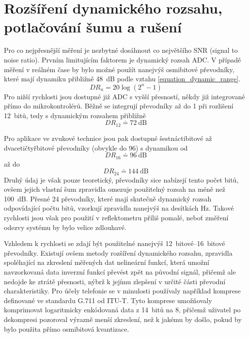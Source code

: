 \chapter{Rozšíření dynamického rozsahu, potlačování šumu a rušení}
Pro co nejpřesnější měření je nezbytné dosáhnout co největšího SNR (signal to noise ratio). Prvním limitujícím faktorem je dynamický rozsah ADC. V případě měření v reálném čase by bylo možné použít nanejvýš osmibitové převodníky, které mají dynamiku přibližně \SI{48}{\deci\bel} podle vztahu \ref{equation_dynamic_range}.
\begin{equation}
	 DR_n=20\log\left(2^n-1\right)
	 \label{equation_dynamic_range}
\end{equation}
Pro nižší rychlosti jsou dostupné již ADC s vyšší přesností, někdy již integrované přímo do mikrokontrolérů. Běžně se integrují převodníky až do \SI{1}{\megasample} při rozlišení 12~bitů, tedy s dynamickým rozsahem přibližně
\begin{equation}
	DR_{12}\doteq \SI{72}{\deci\bel}
\end{equation}

Pro aplikace ve zvukové technice jsou pak dostupné šestnáctibitové až dvacetičtyřbitové převodníky (obvykle do \SI{96}{\kilosample}) s dynamikou od 
\begin{equation}
	DR_{16}\doteq \SI{96}{\deci\bel}
\end{equation} až do
\begin{equation}
	DR_{24}\doteq \SI{144}{\deci\bel}
\end{equation}
 Druhý údaj je však pouze teoretický, převodníky sice nabízejí tento počet bitů, ovšem jejich vlastní šum zpravidla omezuje použitelný rozsah na méně než \SI{100}{\deci\bel}. Přesné \SI{24}{\bit} převodníky, které mají skutečně dynamický rozsah odpovídající počtu bitů, vzorkují zpravidla nanejvýš na desítkách \si{\hertz}. Takové rychlosti jsou však pro použití v reflektometru příliš pomalé, neboť změření odezvy systému by bylo velice zdlouhavé.

Vzhledem k rychlosti se zdají být použitelné nanejvýš \SIrange{12}{16}{bitové} převodníky. Existují ovšem metody rozšíření dynamického rozsahu, zpravidla spoléhající na zkreslení měřených dat nelineární funkcí, která umožní navzorkovaná data inverzní funkcí převést zpět na původní signál, přičemž ale nedojde ke ztrátě přesnosti, nýbrž k jejímu zlepšení v určité části převodní charakteristiky. Pro účely telefonie se v minulosti používaly například komprese definované ve standardu G.711 od ITU-T. Tyto komprese umožňovaly komprimovat logaritmicky enkódovaná data z 14~bitů na 8, přičemž uživatel po dekompresi pozoroval výrazně menší zkreslení, než k jakému by došlo, pokud by bylo použita přímo osmibitová kvantizace.

